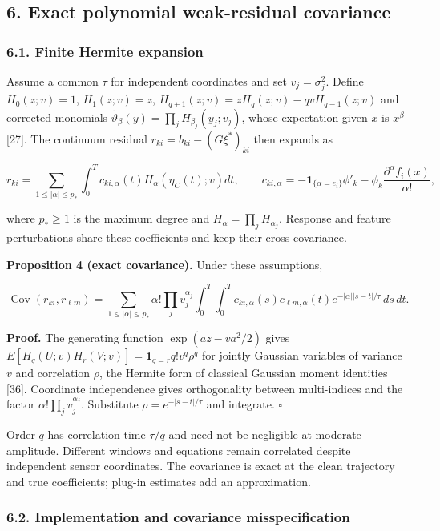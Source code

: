 \documentclass[
  american,
  11pt,
]{article}
\begin{document}
\subsection{6. Exact polynomial weak-residual
covariance}\label{exact-polynomial-weak-residual-covariance}

\subsubsection{6.1. Finite Hermite
expansion}\label{finite-hermite-expansion}

Assume a common \(\tau\) for independent coordinates and set
\(v_j=\sigma_j^2\). Define \(H_0(z;v)=1\), \(H_1(z;v)=z\),
\(H_{q+1}(z;v)=zH_q(z;v)-qvH_{q-1}(z;v)\) and corrected monomials
\(\widetilde\vartheta_\beta(y)=\prod_jH_{\beta_j}(y_j;v_j)\), whose
expectation given \(x\) is \(x^\beta\) {[}27{]}. The continuum residual
\(r_{ki}=b_{ki}-(G\xi^*)_{ki}\) then expands as

\[
r_{ki}=\sum_{1\leq|\alpha|\leq p_*}\int_0^Tc_{ki,\alpha}(t)H_\alpha(\eta_C(t);v)dt,
\qquad
c_{ki,\alpha}=-\mathbf1_{\{\alpha=e_i\}}\phi'_k
-\phi_k\frac{\partial^\alpha f_i(x)}{\alpha!},
\]

where \(p_*\geq1\) is the maximum degree and
\(H_\alpha=\prod_jH_{\alpha_j}\). Response and feature perturbations
share these coefficients and keep their cross-covariance.

\textbf{Proposition 4 (exact covariance).} Under these assumptions,

\[
\operatorname{Cov}(r_{ki},r_{\ell m})=
\sum_{1\leq|\alpha|\leq p_*}\alpha!\prod_jv_j^{\alpha_j}
\int_0^T\int_0^Tc_{ki,\alpha}(s)c_{\ell m,\alpha}(t)
e^{-|\alpha||s-t|/\tau}\,ds\,dt.
\]

\textbf{Proof.} The generating function \(\exp(az-va^2/2)\) gives
\(E[H_q(U;v)H_r(V;v)]=\mathbf1_{q=r}q!v^q\rho^q\) for jointly Gaussian
variables of variance \(v\) and correlation \(\rho\), the Hermite form
of classical Gaussian moment identities {[}36{]}. Coordinate
independence gives orthogonality between multi-indices and the factor
\(\alpha!\prod_jv_j^{\alpha_j}\). Substitute \(\rho=e^{-|s-t|/\tau}\)
and integrate. \(\square\)

Order \(q\) has correlation time \(\tau/q\) and need not be negligible
at moderate amplitude. Different windows and equations remain correlated
despite independent sensor coordinates. The covariance is exact at the
clean trajectory and true coefficients; plug-in estimates add an
approximation.

\subsubsection{6.2. Implementation and covariance
misspecification}\label{implementation-and-covariance-misspecification}
\end{document}
